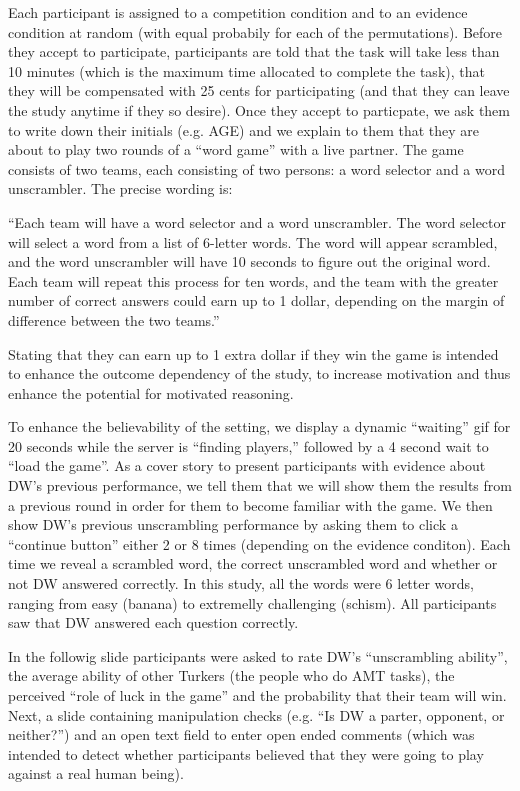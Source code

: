 \documentclass{article}
\begin{document}
Each participant is assigned to a competition condition and to an evidence condition at random (with equal probabily for each of the permutations). Before they accept to participate, participants are told that the task will take less than 10 minutes (which is the maximum time allocated to complete the task), that they will be compensated with 25 cents for participating (and that they can leave the study anytime if they so desire). Once they accept to particpate, we ask them to write down their initials (e.g. AGE) and we explain to them that they are about to play two rounds of a ``word game'' with a live partner. The game consists of two teams, each consisting of two persons: a word selector and a word unscrambler. The precise wording is:

``Each team will have a word selector and a word unscrambler. The word selector will select a word from a list of 6-letter words. The word will appear scrambled, and the word unscrambler will have 10 seconds to figure out the original word. Each team will repeat this process for ten words, and the team with the greater number of correct answers could earn up to 1 dollar, depending on the margin of difference between the two teams.''

Stating that they can earn up to 1 extra dollar if they win the game is intended to enhance the outcome dependency of the study, to increase motivation and thus enhance the potential for motivated reasoning. 

To enhance the believability of the setting, we display a dynamic ``waiting'' gif for 20 seconds while the server is ``finding players,'' followed by a 4 second wait to ``load the game''. As a cover story to present participants with evidence about DW's previous performance, we tell them that we will show them the results from a previous round in order for them to become familiar with the game. We then show DW's previous unscrambling performance by asking them to click a ``continue button'' either 2 or 8 times (depending on the evidence conditon). Each time we reveal a scrambled word, the correct unscrambled word and whether or not DW answered correctly. In this study, all the words were 6 letter words, ranging from easy (banana) to extremelly challenging (schism). All participants saw that DW answered each question correctly.

In the followig slide participants were asked to rate DW's ``unscrambling ability'', the average ability of other Turkers (the people who do AMT tasks), the perceived ``role of luck in the game'' and the probability that their team will win. Next, a slide containing manipulation checks (e.g. ``Is DW a parter, opponent, or neither?'') and an open text field to enter open ended comments (which was intended to detect whether participants believed that they were going to play against a real human being).
\end{document}
